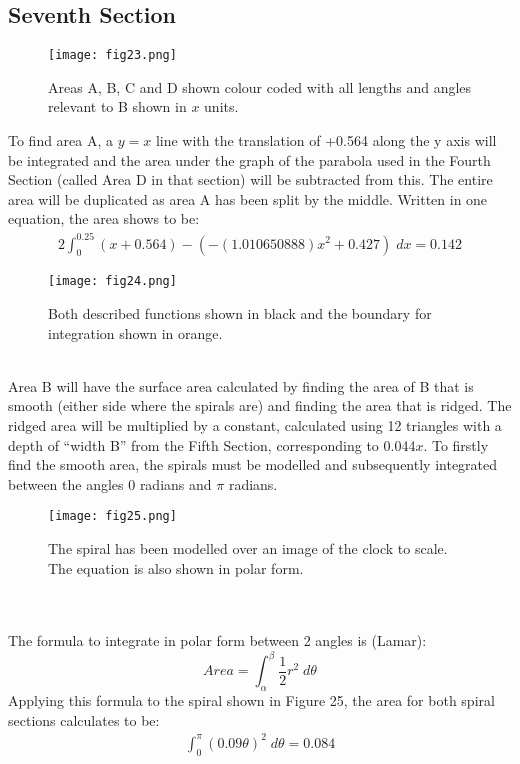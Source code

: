 \documentclass[a4paper,12pt]{article}
\begin{document}
\subsection{Seventh Section}
\begin{figure}[h!]
\centering
\texttt{[image: fig23.png]}
\caption{Areas A, B, C and D shown colour coded with all lengths and angles relevant to B shown in $x$ units.}
\label{fig:clock23}
\end{figure}
To find area A, a $y=x$ line with the translation of +0.564 along the y axis will be integrated and the area under the graph of the parabola used in the Fourth Section (called Area D in that section) will be subtracted from this. The entire area will be duplicated as area A has been split by the middle. Written in one equation, the area shows to be:
\begin{equation}
\begin{aligned} 
2\int_{0}^{0.25}{(x+0.564)-(-(1.010650888)x^2+0.427)}\;dx=0.142
\end{aligned}
\end{equation}
\begin{figure}[h!]
\centering
\texttt{[image: fig24.png]}
\caption{Both described functions shown in black and the boundary for integration shown in orange.}
\label{fig:clock24}
\end{figure}
\\Area B will have the surface area calculated by finding the area of B that is smooth (either side where the spirals are) and finding the area that is ridged. The ridged area will be multiplied by a constant, calculated using 12 triangles with a depth of ``width B'' from the Fifth Section, corresponding to 0.044$x$. To firstly find the smooth area, the spirals must be modelled and subsequently integrated between the angles 0 radians and $\pi$ radians. 
\begin{figure}[h!]
\centering
\texttt{[image: fig25.png]}
\caption{The spiral has been modelled over an image of the clock to scale. The equation is also shown in polar form.}
\label{fig:clock25}
\end{figure}\\\\The formula to integrate in polar form between 2 angles is (Lamar): $$Area=\int_{\alpha}^{\beta}\frac{1}{2}r^2\;d\theta$$
Applying this formula to the spiral shown in Figure  25, the area for both spiral sections calculates to be: 
\begin{equation}
\begin{aligned} 
\int_{0}^{\pi}{(0.09\theta)^2}\;d\theta=0.084
\end{aligned}
\end{equation}
\end{document}
